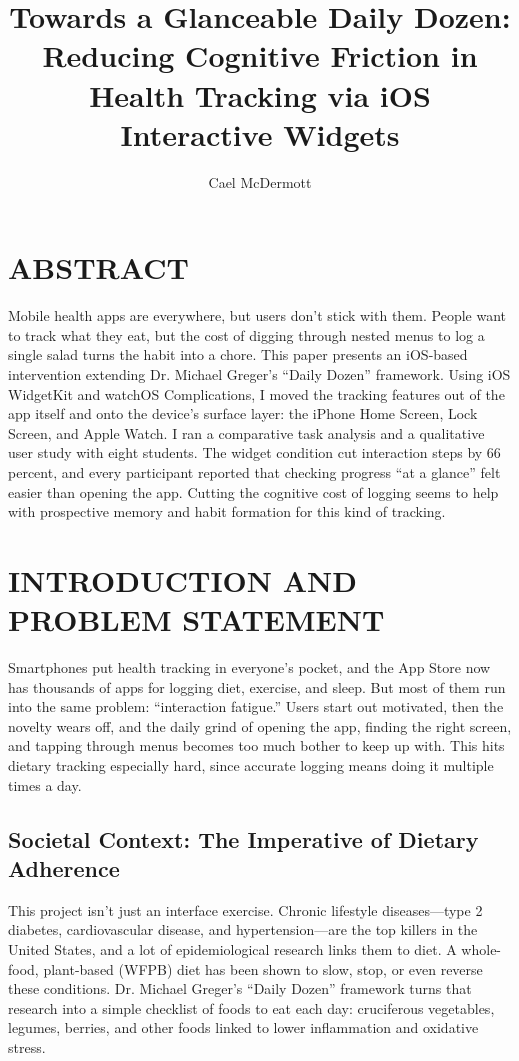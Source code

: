 \documentclass[10pt,twocolumn]{article}
\title{Towards a Glanceable Daily Dozen: Reducing Cognitive Friction in Health Tracking via iOS Interactive Widgets}
\author{Cael McDermott}
\affiliation{Occidental College}
\begin{document}
\maketitle

\section{ABSTRACT}

Mobile health apps are everywhere, but users don't stick with them. People want to track what they eat, but the cost of digging through nested menus to log a single salad turns the habit into a chore. This paper presents an iOS-based intervention extending Dr. Michael Greger's ``Daily Dozen'' framework. Using iOS WidgetKit and watchOS Complications, I moved the tracking features out of the app itself and onto the device's surface layer: the iPhone Home Screen, Lock Screen, and Apple Watch. I ran a comparative task analysis and a qualitative user study with eight students. The widget condition cut interaction steps by 66 percent, and every participant reported that checking progress ``at a glance'' felt easier than opening the app. Cutting the cognitive cost of logging seems to help with prospective memory and habit formation for this kind of tracking.

\section{INTRODUCTION AND PROBLEM STATEMENT}

Smartphones put health tracking in everyone's pocket, and the App Store now has thousands of apps for logging diet, exercise, and sleep.\cite{CDCChronic} But most of them run into the same problem: ``interaction fatigue.'' Users start out motivated, then the novelty wears off, and the daily grind of opening the app, finding the right screen, and tapping through menus becomes too much bother to keep up with. This hits dietary tracking especially hard, since accurate logging means doing it multiple times a day.

\subsection{Societal Context: The Imperative of Dietary Adherence}

This project isn't just an interface exercise. Chronic lifestyle diseases---type 2 diabetes, cardiovascular disease, and hypertension---are the top killers in the United States,\cite{CDCChronic} and a lot of epidemiological research links them to diet. A whole-food, plant-based (WFPB) diet has been shown to slow, stop, or even reverse these conditions. Dr. Michael Greger's ``Daily Dozen'' framework turns that research into a simple checklist of foods to eat each day: cruciferous vegetables, legumes, berries, and other foods linked to lower inflammation and oxidative stress.\cite{GregerHowNotToDie}
\end{document}
